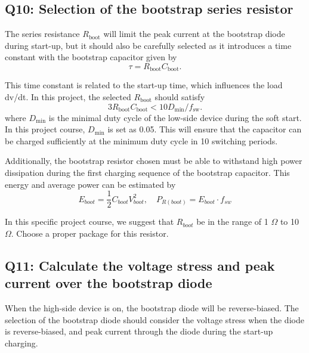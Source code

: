 \documentclass{PELsmallreport}
\begin{document}
\subsection{Q10: Selection of the bootstrap series resistor}
The series resistance $R_\text{boot}$ will limit the peak current at the bootstrap diode during start-up, but it should also be carefully selected as it introduces a time constant with the bootstrap capacitor given by
\begin{equation}
    \tau = R_\text{boot}C_\text{boot}.
\end{equation}

This time constant is related to the start-up time, which influences the load dv/dt. In this project, the selected $R_\text{boot}$ should satisfy  
\begin{equation}
    3 R_\text{boot}C_\text{boot} < 10 D_\text{min}/f_\text{sw}.
\end{equation}
where $D_\text{min}$ is the minimal duty cycle of the low-side device during the soft start. In this project course, $D_\text{min}$ is set as 0.05. This will ensure that the capacitor can be charged sufficiently at the minimum duty cycle in 10 switching periods. 

Additionally, the bootstrap resistor chosen must be able to withstand high power dissipation during the first charging sequence of the bootstrap capacitor. This energy and average power can be estimated by
\begin{equation}
    E_{boot} = \frac{1}{2}C_{boot}V_{boot}^2, \quad P_{R(boot)} =E_{boot} \cdot f_{sw}
\end{equation}

In this specific project course, we suggest that $R_{boot}$ be in the range of 1 $\Omega$ to 10 $\Omega$. Choose a proper package for this resistor.\\

 \quad {} \hfill{}

\subsection{Q11: Calculate the voltage stress and peak current over the bootstrap diode}
When the high-side device is on, the bootstrap diode will be reverse-biased. The selection of the bootstrap diode should consider the voltage stress when the diode is reverse-biased, and peak current through the diode during the start-up charging.\\
\end{document}
